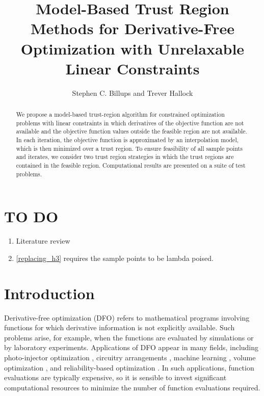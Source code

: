 \documentclass{article}
\title{Model-Based Trust Region Methods for Derivative-Free Optimization with Unrelaxable Linear Constraints}
\author{Stephen C.  Billups and Trever Hallock}
\begin{document}
\maketitle

\begin{abstract}
We propose a model-based trust-region algorithm for constrained optimization problems with linear constraints in which derivatives of the objective function are not available and the objective function values outside the feasible region are not available.
In each iteration, the objective function is approximated by an interpolation model, which is then minimized over a trust region.
To ensure feasibility of all sample points and iterates, we consider two trust region strategies in which the trust regions are contained in the feasible region.
Computational results are presented on a suite of test problems.

\end{abstract}

\newpage

\tableofcontents

\newpage
\section{TO DO}
\begin{enumerate}
\item Literature review
\item \cref{replacing_h3} requires the sample points to be lambda poised.
\end{enumerate}
\section{Introduction}
Derivative-free optimization (DFO) refers to mathematical programs involving functions for which derivative information is not explicitly available.
Such problems arise, for example, when the functions are evaluated by simulations or by laboratory experiments.
Applications of DFO appear in many fields, including photo-injector optimization \cite{Neveu2017},
circuitry arrangements \cite{PLOSKAS201816}, machine learning \cite{KS2018}, volume optimization \cite{Cheng2017}, and reliability-based optimization \cite{Gao2017}.
In such applications, function evaluations are typically expensive, 
so it is sensible to invest significant computational resources to minimize the number of function evaluations required.
\end{document}
